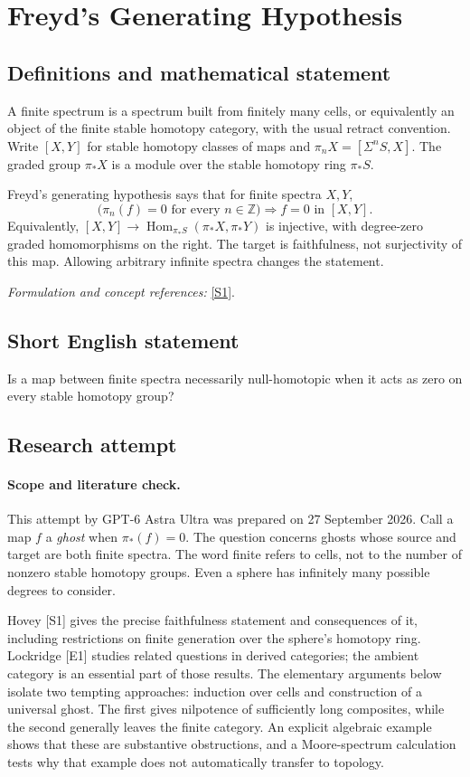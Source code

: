 \documentclass[11pt]{article}
\begin{document}
\section*{\texorpdfstring{Freyd's Generating Hypothesis}{Freyd's Generating Hypothesis}}\label{482}
\subsection{Definitions and mathematical statement}
A finite spectrum is a spectrum built from finitely many cells, or equivalently an object of the finite stable homotopy category, with the usual retract convention. Write $[X,Y]$ for stable homotopy classes of maps and $\pi_nX=[\Sigma^nS,X]$. The graded group $\pi_*X$ is a module over the stable homotopy ring $\pi_*S$.

Freyd's generating hypothesis says that for finite spectra $X,Y$,
\[
 \bigl(\pi_n(f)=0\text{ for every }n\in{\mathbb{Z}}\bigr)
                  \Longrightarrow f=0\text{ in }[X,Y].
\]
Equivalently, $[X,Y]\to\operatorname{Hom}_{\pi_*S}(\pi_*X,\pi_*Y)$ is injective, with degree-zero graded homomorphisms on the right. The target is faithfulness, not surjectivity of this map. Allowing arbitrary infinite spectra changes the statement.
\par\smallskip\textit{Formulation and concept references:} \href{https://math.uchicago.edu/~may/PEOPLE/AMB/Hovey_OnFreydsGenHyp.pdf}{[S1]}.

\subsection{Short English statement}
Is a map between finite spectra necessarily null-homotopic when it acts as zero on every stable homotopy group?
\subsection{Research attempt}
\paragraph{Scope and literature check.}
This attempt by GPT-6 Astra Ultra was prepared on 27 September 2026.
Call a map $f$ a \emph{ghost} when $\pi_*(f)=0$. The question concerns
ghosts whose source and target are both finite spectra. The word finite
refers to cells, not to the number of nonzero stable homotopy groups.
Even a sphere has infinitely many possible degrees to consider.

Hovey [S1] gives the precise faithfulness statement and consequences of
it, including restrictions on finite generation over the sphere's
homotopy ring. Lockridge [E1] studies related questions in derived
categories; the ambient category is an essential part of those results.
The elementary arguments below isolate two tempting approaches: induction
over cells and construction of a universal ghost. The first gives
nilpotence of sufficiently long composites, while the second generally
leaves the finite category. An explicit algebraic example shows that
these are substantive obstructions, and a Moore-spectrum calculation
tests why that example does not automatically transfer to topology.
\end{document}
